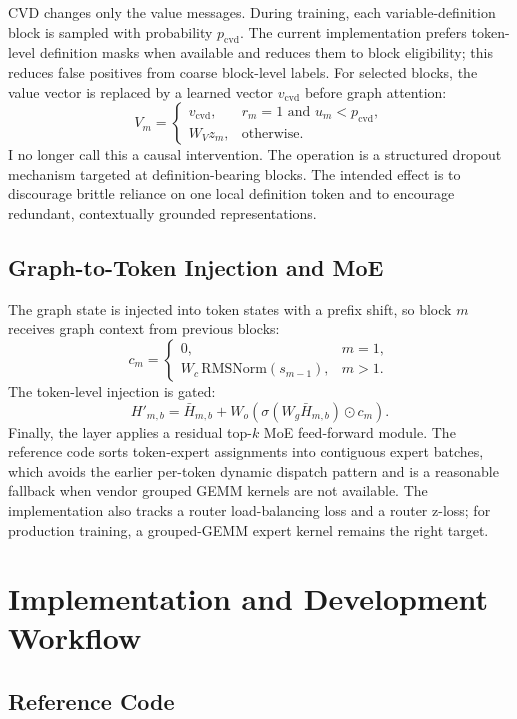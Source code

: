 \documentclass[10pt]{article}
\begin{document}
CVD changes only the value messages.  During training, each variable-definition
block is sampled with probability $p_{\mathrm{cvd}}$.  The current
implementation prefers token-level definition masks when available and reduces
them to block eligibility; this reduces false positives from coarse block-level
labels.  For selected blocks, the
value vector is replaced by a learned vector $v_{\mathrm{cvd}}$ before graph
attention:
\[
  V_m =
  \begin{cases}
    v_{\mathrm{cvd}}, & r_m=1 \text{ and } u_m < p_{\mathrm{cvd}},\\
    W_V z_m, & \text{otherwise}.
  \end{cases}
\]
I no longer call this a causal intervention.  The operation is a structured
dropout mechanism targeted at definition-bearing blocks.  The intended effect
is to discourage brittle reliance on one local definition token and to encourage
redundant, contextually grounded representations.

\subsection{Graph-to-Token Injection and MoE}

The graph state is injected into token states with a prefix shift, so block $m$
receives graph context from previous blocks:
\[
  c_m =
  \begin{cases}
    0, & m=1,\\
    W_c\,\mathrm{RMSNorm}(s_{m-1}), & m>1.
  \end{cases}
\]
The token-level injection is gated:
\[
  H'_{m,b}=\bar H_{m,b} + W_o\left(\sigma(W_g\bar H_{m,b})\odot c_m\right).
\]
Finally, the layer applies a residual top-$k$ MoE feed-forward module.  The
reference code sorts token-expert assignments into contiguous expert batches,
which avoids the earlier per-token dynamic dispatch pattern and is a reasonable
fallback when vendor grouped GEMM kernels are not available.  The implementation
also tracks a router load-balancing loss and a router z-loss; for production
training, a grouped-GEMM expert kernel remains the right target.

\section{Implementation and Development Workflow}

\subsection{Reference Code}
\end{document}
